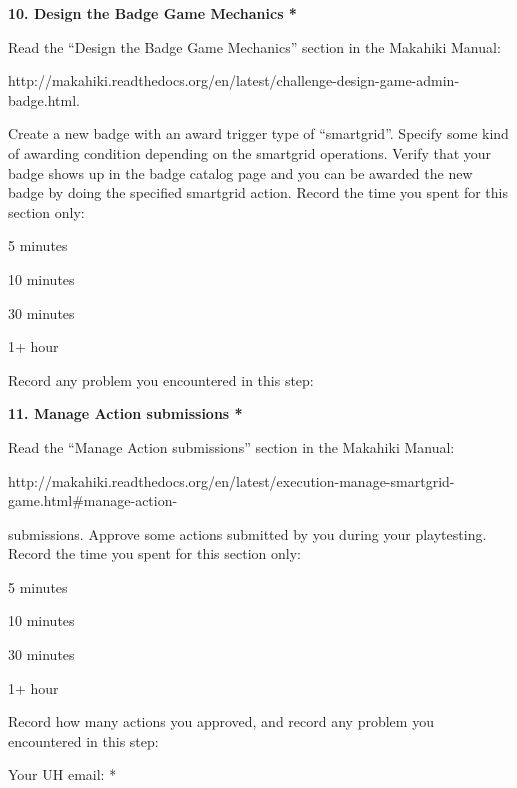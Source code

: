 {\bf 10. Design the Badge Game Mechanics *}

Read the ``Design the Badge Game Mechanics'' section in the Makahiki Manual:

http://makahiki.readthedocs.org/en/latest/challenge-design-game-admin-badge.html. 

Create a new badge with an award trigger type of ``smartgrid''. Specify some kind of awarding condition depending on the smartgrid operations. Verify that your badge shows up in the badge catalog page and you can be awarded the new badge by doing the specified smartgrid action. Record the time you spent for this section only:

\begin{radiobutton}
\item 5 minutes
\item  10 minutes
\item  30 minutes
\item  1+ hour
\end{radiobutton}

Record any problem you encountered in this step: \underline{\hspace{4cm}}

{\bf 11. Manage Action submissions *}

Read the ``Manage Action submissions'' section in the Makahiki Manual:

http://makahiki.readthedocs.org/en/latest/execution-manage-smartgrid-game.html\#manage-action-

submissions. Approve some actions submitted by you during your playtesting. Record the time you spent for this section only:

\begin{radiobutton}
\item 5 minutes
\item  10 minutes
\item  30 minutes
\item  1+ hour
\end{radiobutton}

Record how many actions you approved, and record any problem you encountered in this step: 

\underline{\hspace{4cm}}

Your UH email: * \underline{\hspace{4cm}}
